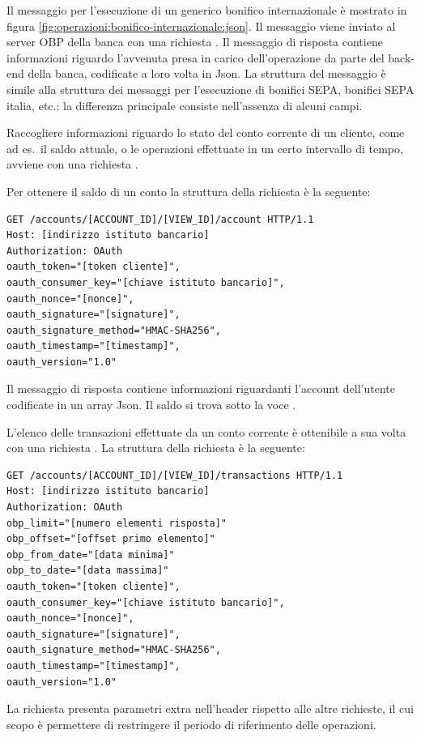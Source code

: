 Il messaggio per l'esecuzione di un generico bonifico internazionale \`e mostrato in figura \ref{fig:operazioni:bonifico-internazionale:json}.
Il messaggio viene inviato al server OBP della banca con una richiesta .
Il messaggio di risposta contiene informazioni riguardo l'avvenuta presa in carico dell'operazione da parte del back-end della banca, codificate a loro volta in Json.
La struttura del messaggio \`e simile alla struttura dei messaggi per l'esecuzione di bonifici SEPA, bonifici SEPA italia, etc.: la differenza principale consiste nell'assenza di alcuni campi.

Raccogliere informazioni riguardo lo stato del conto corrente di un cliente, come ad es.\ il saldo attuale, o le operazioni effettuate in un certo intervallo di tempo, avviene con una richiesta .

Per ottenere il saldo di un conto la struttura della richiesta \`e la seguente:
\begin{lstlisting}[basicstyle=\ttfamily]
GET /accounts/[ACCOUNT_ID]/[VIEW_ID]/account HTTP/1.1
Host: [indirizzo istituto bancario]
Authorization: OAuth
oauth_token="[token cliente]",
oauth_consumer_key="[chiave istituto bancario]",
oauth_nonce="[nonce]",
oauth_signature="[signature]",
oauth_signature_method="HMAC-SHA256",
oauth_timestamp="[timestamp]",
oauth_version="1.0"
\end{lstlisting}
Il messaggio di risposta contiene informazioni riguardanti l'account dell'utente codificate in un array Json.
Il saldo si trova sotto la voce .

L'elenco delle transazioni effettuate da un conto corrente \`e ottenibile a sua volta con una richiesta .
La struttura della richiesta \`e la seguente:
\begin{lstlisting}[basicstyle=\ttfamily]
GET /accounts/[ACCOUNT_ID]/[VIEW_ID]/transactions HTTP/1.1
Host: [indirizzo istituto bancario]
Authorization: OAuth
obp_limit="[numero elementi risposta]"
obp_offset="[offset primo elemento]"
obp_from_date="[data minima]"
obp_to_date="[data massima]"
oauth_token="[token cliente]",
oauth_consumer_key="[chiave istituto bancario]",
oauth_nonce="[nonce]",
oauth_signature="[signature]",
oauth_signature_method="HMAC-SHA256",
oauth_timestamp="[timestamp]",
oauth_version="1.0"
\end{lstlisting}
La richiesta presenta parametri extra nell'header rispetto alle altre richieste, il cui scopo \`e permettere di restringere il periodo di riferimento delle operazioni.


